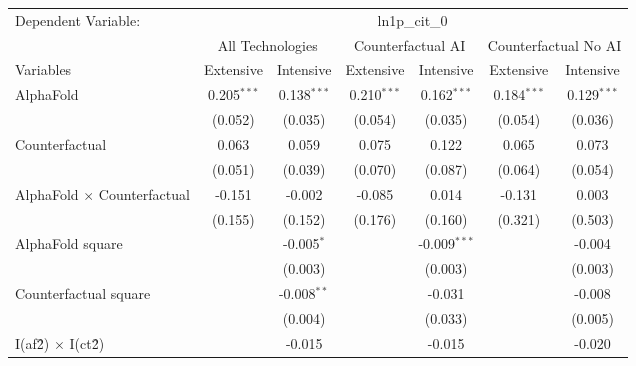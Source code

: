 \begingroup
\centering
\begin{tabular}{lcccccc}
   \tabularnewline \midrule \midrule
   Dependent Variable: & \multicolumn{6}{c}{ln1p\_cit\_0}\\
 & \multicolumn{2}{c}{All Technologies} & \multicolumn{2}{c}{Counterfactual AI} & \multicolumn{2}{c}{Counterfactual No AI} \\
\cmidrule(lr){1-1}\cmidrule(lr){2-3} \cmidrule(lr){4-5} \cmidrule(lr){6-7}
Variables & \multicolumn{1}{c}{Extensive} & \multicolumn{1}{c}{Intensive} & \multicolumn{1}{c}{Extensive} & \multicolumn{1}{c}{Intensive} & \multicolumn{1}{c}{Extensive} & \multicolumn{1}{c}{Intensive} \\
\cmidrule(lr){1-1}\cmidrule(lr){2-2} \cmidrule(lr){3-3} \cmidrule(lr){4-4} \cmidrule(lr){5-5} \cmidrule(lr){6-6} \cmidrule(lr){7-7}
   AlphaFold                          & 0.205$^{***}$ & 0.138$^{***}$ & 0.210$^{***}$ & 0.162$^{***}$  & 0.184$^{***}$ & 0.129$^{***}$\\   
                                      & (0.052)       & (0.035)       & (0.054)       & (0.035)        & (0.054)       & (0.036)\\   
   Counterfactual                     & 0.063         & 0.059         & 0.075         & 0.122          & 0.065         & 0.073\\   
                                      & (0.051)       & (0.039)       & (0.070)       & (0.087)        & (0.064)       & (0.054)\\   
   AlphaFold $\times$ Counterfactual  & -0.151        & -0.002        & -0.085        & 0.014          & -0.131        & 0.003\\   
                                      & (0.155)       & (0.152)       & (0.176)       & (0.160)        & (0.321)       & (0.503)\\   
   AlphaFold square                   &               & -0.005$^{*}$  &               & -0.009$^{***}$ &               & -0.004\\   
                                      &               & (0.003)       &               & (0.003)        &               & (0.003)\\   
   Counterfactual square              &               & -0.008$^{**}$ &               & -0.031         &               & -0.008\\   
                                      &               & (0.004)       &               & (0.033)        &               & (0.005)\\   
   I(af\^2) $\times$ I(ct\^2)         &               & -0.015        &               & -0.015         &               & -0.020\\   

\end{tabular}
